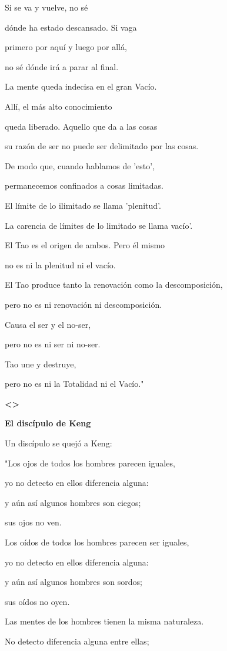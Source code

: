 Si se va y vuelve, no sé

dónde ha estado descansado. Si vaga

primero por aquí y luego por allá,

no sé dónde irá a parar al final.

La mente queda indecisa en el gran Vacío.

Allí, el más alto conocimiento

queda liberado. Aquello que da a las cosas

su razón de ser no puede ser delimitado por las cosas.

De modo que, cuando hablamos de 'esto',

permanecemos confinados a cosas limitadas.

El límite de lo ilimitado se llama 'plenitud'.

La carencia de límites de lo limitado se llama vacío'.

El Tao es el origen de ambos. Pero él mismo

no es ni la plenitud ni el vacío.

El Tao produce tanto la renovación como la descomposición,

pero no es ni renovación ni descomposición.

Causa el ser y el no-ser,

pero no es ni ser ni no-ser.

Tao une y destruye,

pero no es ni la Totalidad ni el Vacío."

\textbf{\textless\textgreater{}}

\textbf{{El discípulo de Keng}}

Un discípulo se quejó a Keng:

"Los ojos de todos los hombres parecen iguales,

yo no detecto en ellos diferencia alguna:

y aún así algunos hombres son ciegos;

sus ojos no ven.

Los oídos de todos los hombres parecen ser iguales,

yo no detecto en ellos diferencia alguna:

y aún así algunos hombres son sordos;

sus oídos no oyen.

Las mentes de los hombres tienen la misma naturaleza.

No detecto diferencia alguna entre ellas;

